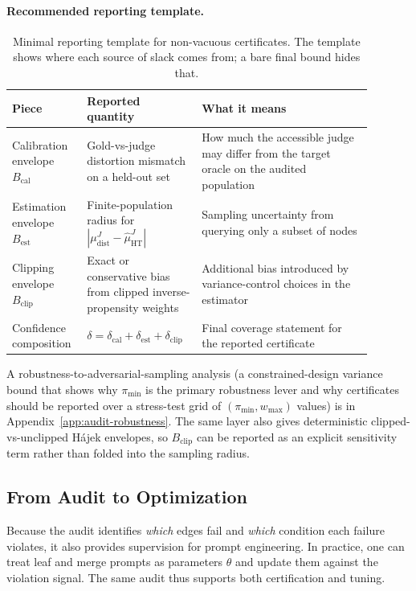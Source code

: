 \paragraph{Recommended reporting template.}
\begin{table}[htbp]
\centering\small
\begin{tabular}{p{0.17\linewidth}p{0.28\linewidth}p{0.44\linewidth}}
\toprule
Piece & Reported quantity & What it means \\
\midrule
Calibration envelope $B_{\mathrm{cal}}$ & Gold-vs-judge distortion mismatch on a held-out set & How much the accessible judge may differ from the target oracle on the audited population \\
Estimation envelope $B_{\mathrm{est}}$ & Finite-population radius for $|\mu_{\mathrm{dist}}^{J}-\hat{\mu}_{\mathrm{HT}}^{J}|$ & Sampling uncertainty from querying only a subset of nodes \\
Clipping envelope $B_{\mathrm{clip}}$ & Exact or conservative bias from clipped inverse-propensity weights & Additional bias introduced by variance-control choices in the estimator \\
Confidence composition & $\delta=\delta_{\mathrm{cal}}+\delta_{\mathrm{est}}+\delta_{\mathrm{clip}}$ & Final coverage statement for the reported certificate \\
\bottomrule
\end{tabular}
\caption{Minimal reporting template for non-vacuous certificates. The template shows where each source of slack comes from; a bare final bound hides that.}
\label{tab:reporting-template}
\end{table}

A robustness-to-adversarial-sampling analysis (a constrained-design variance bound that shows why $\pi_{\min}$ is the primary robustness lever and why certificates should be reported over a stress-test grid of $(\pi_{\min}, w_{\max})$ values) is in Appendix~\ref{app:audit-robustness}. The same layer also gives deterministic clipped-vs-unclipped H\'ajek envelopes, so $B_{\mathrm{clip}}$ can be reported as an explicit sensitivity term rather than folded into the sampling radius.

\subsection{From Audit to Optimization}

Because the audit identifies \emph{which} edges fail and \emph{which} condition each failure violates, it also provides supervision for prompt engineering. In practice, one can treat leaf and merge prompts as parameters $\theta$ and update them against the violation signal. The same audit thus supports both certification and tuning.

